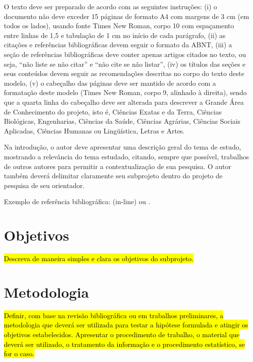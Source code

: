 \documentclass[10pt, a4paper]{article}
\begin{document}
O texto deve ser preparado de acordo com as seguintes instruções: (i) o documento não deve exceder 15 páginas de formato A4 com margens de 3 cm (em todos os lados), usando fonte Times New Roman, corpo 10 com espaçamento entre linhas de 1,5 e tabulação de 1 cm no início de cada parágrafo, (ii) as citações e referências bibliográficas devem seguir o formato da ABNT, (iii) a seção de referências bibliográficas deve conter apenas artigos citados no texto, ou seja, “não liste se não citar” e “não cite se não listar”, (iv) os títulos das seções e seus conteúdos devem seguir as recomendações descritas no corpo do texto deste modelo, (v) o cabeçalho das páginas deve ser mantido de acordo com a formatação deste modelo (Times New Roman, corpo 9, alinhado à direita), sendo que a quarta linha do cabeçalho deve ser alterada para descrever a Grande Área de Conhecimento do projeto, isto é, Ciências Exatas e da Terra, Ciências Biológicas, Engenharias, Ciências da Saúde, Ciências Agrárias, Ciências Sociais Aplicadas, Ciências Humanas ou Lingüística, Letras e Artes.

Na introdução, o autor deve apresentar uma descrição geral do tema de estudo, mostrando a relevância do tema estudado, citando, sempre que possível, trabalhos de outros autores para permitir a contextualização de sua pesquisa. O autor também deverá delimitar claramente seu subprojeto dentro do projeto de pesquisa de seu orientador. 

Exemplo de referência bibliográfica: \cite{guarino-et-al:hobook09} (in-line) ou \citep{guarino-et-al:hobook09}.



\section{Objetivos}
\label{sec-objetivos}

\hl{Descreva de maneira simples e clara os objetivos do subprojeto.}



\section{Metodologia}
\label{sec-metodo}

\hl{Definir, com base na revisão bibliográfica ou em trabalhos preliminares, a metodologia que deverá ser utilizada para testar a hipótese formulada e atingir os objetivos estabelecidos. Apresentar o procedimento de trabalho, o material que deverá ser utilizado, o tratamento da informação e o procedimento estatístico, se for o caso.}
\end{document}

